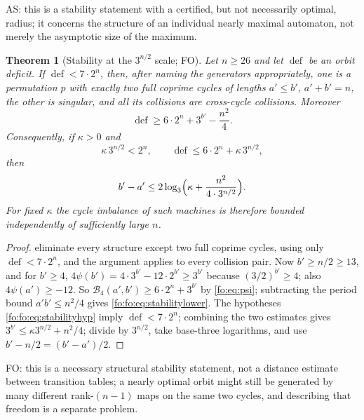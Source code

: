\documentclass[11pt,a4paper]{article}
\numberwithin{equation}{section}
\newtheorem{theorem}{Theorem}[section]
\theoremstyle{definition}
\theoremstyle{remark}
\newcommand{\Bip}{\mathcal B}
\newcommand{\defi}{\operatorname{def}}
\begin{document}
AS: this is a stability statement with a certified, but not necessarily
optimal, radius; it concerns the structure of an individual nearly maximal
automaton, not merely the asymptotic size of the maximum.

\begin{theorem}[Stability at the $3^{n/2}$ scale; FO]\label{fo:fo:thm:stability}
Let $n\ge26$ and let $\defi$ be an orbit deficit. If $\defi<7\cdot2^n$, then,
after naming the generators appropriately, one is a permutation $p$ with
exactly two full coprime cycles of lengths $a'\le b'$, $a'+b'=n$, the other is
singular, and all its collisions are cross-cycle collisions. Moreover
\begin{equation}\label{fo:fo:eq:stabilitylower}
 \defi\ge6\cdot2^n+3^{b'}-\frac{n^2}{4}.
\end{equation}
Consequently, if $\kappa>0$ and
\begin{equation}\label{fo:fo:eq:stabilityhyp}
 \kappa\,3^{n/2}<2^n,\qquad \defi\le6\cdot2^n+\kappa\,3^{n/2},
\end{equation}
then
\begin{equation}\label{fo:fo:eq:imbalance}
 b'-a'\le2\log_3\Bigl(\kappa+\frac{n^2}{4\cdot3^{n/2}}\Bigr).
\end{equation}
For fixed $\kappa$ the cycle imbalance of such machines is therefore bounded
independently of sufficiently large $n$.
\end{theorem}

\begin{proof}
 eliminate every structure except two
full coprime cycles, using only $\defi<7\cdot2^n$, and the argument applies to
every collision pair. Now $b'\ge n/2\ge13$, and for $b'\ge4$,
$4\psi(b')=4\cdot3^{b'}-12\cdot2^{b'}\ge3^{b'}$ because $(3/2)^{b'}\ge4$; also
$4\psi(a')\ge-12$. So $\Bip_4(a',b')\ge6\cdot2^n+3^{b'}$ by \eqref{fo:eq:psi};
subtracting the period bound $a'b'\le n^2/4$ gives
\eqref{fo:fo:eq:stabilitylower}. The hypotheses \eqref{fo:fo:eq:stabilityhyp}
imply $\defi<7\cdot2^n$; combining the two estimates gives
$3^{b'}\le\kappa3^{n/2}+n^2/4$; divide by $3^{n/2}$, take base-three logarithms,
and use $b'-n/2=(b'-a')/2$.
\end{proof}

FO: this is a necessary structural stability statement, not a distance
estimate between transition tables; a nearly optimal orbit might still be
generated by many different rank-$(n-1)$ maps on the same two cycles, and
describing that freedom is a separate problem.
\end{document}
